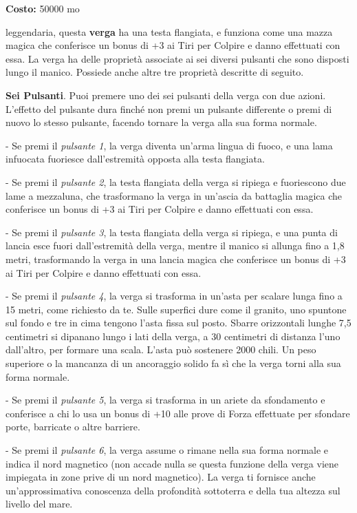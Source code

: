 \begin{multicols}{2}

\textbf{Costo:} 50000 mo

leggendaria, questa \textbf{verga} ha una testa flangiata, e funziona come una mazza magica che conferisce un bonus di +3 ai Tiri per Colpire e danno effettuati con essa. La verga ha delle proprietà associate ai sei diversi pulsanti che sono disposti lungo il manico. Possiede anche altre tre proprietà descritte di seguito.

\textbf{Sei Pulsanti}. Puoi premere uno dei sei pulsanti della verga con due azioni. L'effetto del pulsante dura finché non premi un pulsante differente o premi di nuovo lo stesso pulsante, facendo tornare la verga alla sua forma normale.

- Se premi il \emph{pulsante 1}, la verga diventa un'arma lingua di fuoco, e una lama infuocata fuoriesce dall'estremità opposta alla testa flangiata.

- Se premi il \emph{pulsante 2}, la testa flangiata della verga si ripiega e fuoriescono due lame a mezzaluna, che trasformano la verga in un'ascia da battaglia magica che conferisce un bonus di +3 ai Tiri per Colpire e danno effettuati con essa.

- Se premi il \emph{pulsante 3}, la testa flangiata della verga si ripiega, e una punta di lancia esce fuori dall'estremità della verga, mentre il manico si allunga fino a 1,8 metri, trasformando la verga in una lancia magica che conferisce un bonus di +3 ai Tiri per Colpire e danno effettuati con essa.

- Se premi il \emph{pulsante 4}, la verga si trasforma in un'asta per scalare lunga fino a 15 metri, come richiesto da te. Sulle superfici dure come il granito, uno spuntone sul fondo e tre in cima tengono l'asta fissa sul posto. Sbarre orizzontali lunghe 7,5 centimetri si dipanano lungo i lati della verga, a 30 centimetri di distanza l'uno dall'altro, per formare una scala. L'asta può sostenere 2000 chili. Un peso superiore o la mancanza di un ancoraggio solido fa sì che la verga torni alla sua forma normale.

- Se premi il \emph{pulsante 5}, la verga si trasforma in un ariete da sfondamento e conferisce a chi lo usa un bonus di +10 alle prove di Forza effettuate per sfondare porte, barricate o altre barriere.

- Se premi il \emph{pulsante 6}, la verga assume o rimane nella sua forma normale e indica il nord magnetico (non accade nulla se questa funzione della verga viene impiegata in zone prive di un nord magnetico). La verga ti fornisce anche un'approssimativa conoscenza della profondità sottoterra e della tua altezza sul livello del mare.


\end{multicols}
